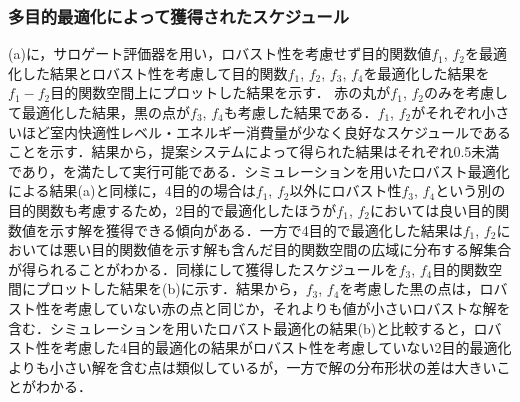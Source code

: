 \subsubsection{多目的最適化によって獲得されたスケジュール}
(a)に，サロゲート評価器を用い，ロバスト性を考慮せず目的関数値$f_1$, $f_2$を最適化した結果とロバスト性を考慮して目的関数$f_1$, $f_2$, $f_3$, $f_4$を最適化した結果を$f_1-f_2$目的関数空間上にプロットした結果を示す．
赤の丸が$f_1$, $f_2$のみを考慮して最適化した結果，黒の点が$f_3$, $f_4$も考慮した結果である．$f_1$, $f_2$がそれぞれ小さいほど室内快適性レベル・エネルギー消費量が少なく良好なスケジュールであることを示す．結果から，提案システムによって得られた結果はそれぞれ0.5未満であり，を満たして実行可能である．シミュレーションを用いたロバスト最適化による結果(a)と同様に，4目的の場合は$f_1$, $f_2$以外にロバスト性$f_3$, $f_4$という別の目的関数も考慮するため，2目的で最適化したほうが$f_1$, $f_2$においては良い目的関数値を示す解を獲得できる傾向がある．一方で4目的で最適化した結果は$f_1$, $f_2$においては悪い目的関数値を示す解も含んだ目的関数空間の広域に分布する解集合が得られることがわかる．同様にして獲得したスケジュールを$f_3$, $f_4$目的関数空間にプロットした結果を(b)に示す．結果から，$f_3$, $f_4$を考慮した黒の点は，ロバスト性を考慮していない赤の点と同じか，それよりも値が小さいロバストな解を含む．シミュレーションを用いたロバスト最適化の結果(b)と比較すると，ロバスト性を考慮した4目的最適化の結果がロバスト性を考慮していない2目的最適化よりも小さい解を含む点は類似しているが，一方で解の分布形状の差は大きいことがわかる．

